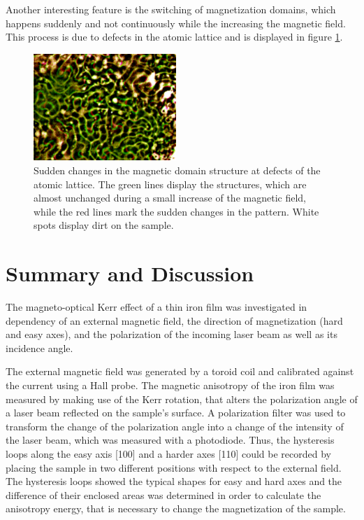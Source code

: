 \documentclass[a4paper]{scrartcl}
\numberwithin{equation}{section}
\numberwithin{figure}{section}
\numberwithin{table}{section}
\begin{document}
Another interesting feature is the switching of magnetization domains, which happens suddenly and not continuously while the increasing the magnetic field. This process is due to defects in the atomic lattice and is displayed in figure \ref{fig:defect}.
\begin{figure}
    \includegraphics[width=0.48\textwidth]{img/kontrast.pdf}
  \caption{ \small Sudden changes in the magnetic domain structure at defects of the atomic lattice. The green lines display the structures, which are almost unchanged during a small increase of the magnetic field, while the red lines mark the sudden changes in the pattern. White spots display dirt on the sample. }
  	\label{fig:defect}
\end{figure}



\section{Summary and Discussion}
The magneto-optical Kerr effect of a thin iron film was investigated in dependency of an external magnetic field, the direction of magnetization (hard and easy axes), and the polarization of the incoming laser beam as well as its incidence angle. 

The external magnetic field was generated by a toroid coil and calibrated against the current using a Hall probe. The magnetic anisotropy of the iron film was measured by making use of the Kerr rotation, that alters the polarization angle of a laser beam reflected on the sample's surface. A polarization filter was used to transform the change of the polarization angle into a change of the intensity of the laser beam, which was measured with a photodiode. Thus, the hysteresis loops along the easy axis [100] and a harder axes [110] could be recorded by placing the sample in two different positions with respect to the external field. The hysteresis loops showed the typical shapes for easy and hard axes and the difference of their enclosed areas was determined in order to calculate the anisotropy energy, that is necessary to change the magnetization of the sample.
\end{document}
